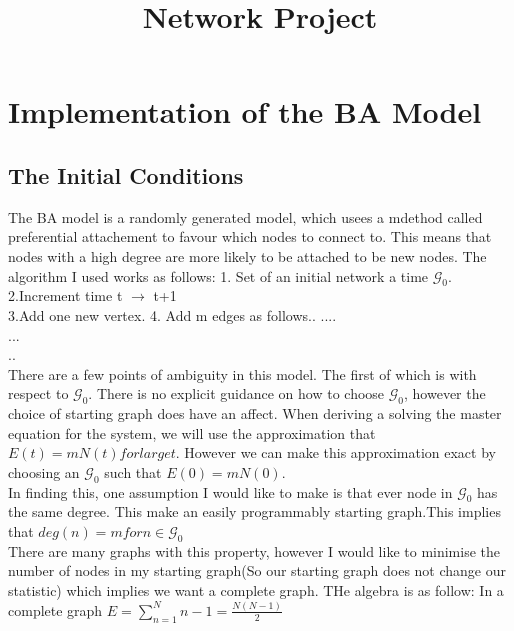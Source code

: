 \documentclass[]{article}
\title{Network Project}
\author{}
\begin{document}
\maketitle

\begin{abstract}

\end{abstract}

\section{Implementation of the BA Model}
\subsection{The Initial Conditions}
The BA model is a randomly generated model, which usees a mdethod called preferential attachement to favour which nodes to connect to. This means that nodes with a high degree are more likely to be attached to be new nodes. The algorithm I used works as follows:
1. Set of an initial network a time $\mathcal{G_0}$.\\
\newline
2.Increment time t $\rightarrow$ t+1\\
\newline
3.Add one new vertex.
4. Add m edges as follows..
....\\...\\..\\
There are a few points of ambiguity in this model. The first of which is with respect to $\mathcal{G}_0$. There is no explicit guidance on how to choose $\mathcal{G}_0\!$, however the choice of starting graph does have an affect. When deriving a solving the master equation for the system, we will use the approximation that $E(t)=mN(t) \!for\! large\! t$. However we can make this approximation exact by choosing an $\mathcal{G}_0$ such that $E(0)=mN(0)$.\\
In finding this, one assumption I would like to make is that ever node in $\mathcal{G_0}$ has the same degree. This make an easily programmably starting graph.This implies that $deg(n)=m\! for\! n \in \mathcal{G_0}$\\
There are many graphs with this property, however I would like to minimise the number of nodes in my starting graph(So our starting graph does not change our statistic) which implies we want a complete graph. THe algebra is as follow:
In a complete graph $E=\sum_{n=1}^{N} n-1 = \frac{N(N-1)}{2}$\\
\end{document}

